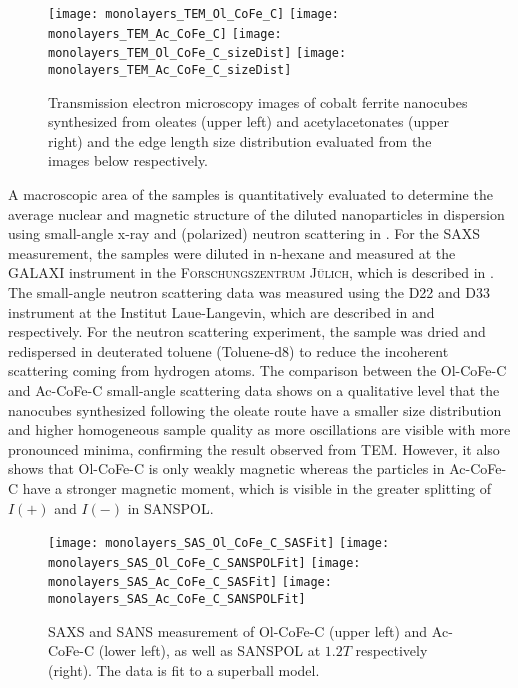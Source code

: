 \documentclass[\main/dresen_thesis.tex]{subfiles}
\begin{document}
    \begin{figure}[tb]
      \centering
      \hspace{0.3 cm}
      \texttt{[image: monolayers\_TEM\_Ol\_CoFe\_C]}
      \hspace{0.3 cm}
      \texttt{[image: monolayers\_TEM\_Ac\_CoFe\_C]}
      \texttt{[image: monolayers\_TEM\_Ol\_CoFe\_C\_sizeDist]}
      \texttt{[image: monolayers\_TEM\_Ac\_CoFe\_C\_sizeDist]}
      \caption{\label{fig:monolayers:nanoparticle:tem}Transmission electron microscopy images of cobalt ferrite nanocubes synthesized from oleates (upper left) and acetylacetonates (upper right) and the edge length size distribution evaluated from the images below respectively.}
    \end{figure}

    A macroscopic area of the samples is quantitatively evaluated to determine the average nuclear and magnetic structure of the diluted nanoparticles in dispersion using small-angle x-ray and (polarized) neutron scattering in .
    For the SAXS measurement, the samples were diluted in n-hexane and measured at the GALAXI instrument in the \textsc{Forschungszentrum J\"ulich}, which is described in .
    The small-angle neutron scattering data was measured using the D22 and D33 instrument at the Institut Laue-Langevin, which are described in  and  respectively.
    For the neutron scattering experiment, the sample was dried and redispersed in deuterated toluene (Toluene-d8) to reduce the incoherent scattering coming from hydrogen atoms.
    The comparison between the Ol-CoFe-C and Ac-CoFe-C small-angle scattering data shows on a qualitative level that the nanocubes synthesized following the oleate route have a smaller size distribution and higher homogeneous sample quality as more oscillations are visible with more pronounced minima, confirming the result observed from TEM.
    However, it also shows that Ol-CoFe-C is only weakly magnetic whereas the particles in Ac-CoFe-C have a stronger magnetic moment, which is visible in the greater splitting of $I(+)$ and $I(-)$ in SANSPOL.

    \begin{figure}[tb]
      \centering
      \texttt{[image: monolayers\_SAS\_Ol\_CoFe\_C\_SASFit]}
      \texttt{[image: monolayers\_SAS\_Ol\_CoFe\_C\_SANSPOLFit]}
      \texttt{[image: monolayers\_SAS\_Ac\_CoFe\_C\_SASFit]}
      \texttt{[image: monolayers\_SAS\_Ac\_CoFe\_C\_SANSPOLFit]}
      \caption{\label{fig:monolayers:nanoparticle:sas:AcOlCoFeC}SAXS and SANS measurement of Ol-CoFe-C (upper left) and Ac-CoFe-C (lower left), as well as SANSPOL at $1.2 \unit{T}$ respectively (right). The data is fit to a superball model.}
    \end{figure}
\end{document}
